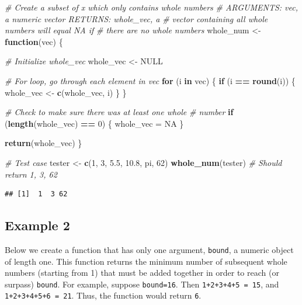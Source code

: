 \documentclass[
]{book}
\newenvironment{Shaded}{\begin{snugshade}}{\end{snugshade}}
\newcommand{\CommentTok}[1]{\textcolor[rgb]{0.56,0.35,0.01}{\textit{#1}}}
\newcommand{\ControlFlowTok}[1]{\textcolor[rgb]{0.13,0.29,0.53}{\textbf{#1}}}
\newcommand{\DecValTok}[1]{\textcolor[rgb]{0.00,0.00,0.81}{#1}}
\newcommand{\FloatTok}[1]{\textcolor[rgb]{0.00,0.00,0.81}{#1}}
\newcommand{\KeywordTok}[1]{\textcolor[rgb]{0.13,0.29,0.53}{\textbf{#1}}}
\newcommand{\NormalTok}[1]{#1}
\newcommand{\OperatorTok}[1]{\textcolor[rgb]{0.81,0.36,0.00}{\textbf{#1}}}
\newcommand{\OtherTok}[1]{\textcolor[rgb]{0.56,0.35,0.01}{#1}}
\newcommand{\StringTok}[1]{\textcolor[rgb]{0.31,0.60,0.02}{#1}}
\begin{document}
\begin{Shaded}
\begin{Highlighting}[]
\CommentTok{# Create a subset of x which only contains whole numbers}
\CommentTok{# ARGUMENTS: vec, a numeric vector RETURNS: whole_vec, a}
\CommentTok{# vector containing all whole numbers will equal NA if}
\CommentTok{# there are no whole numbers}
\NormalTok{whole_num <-}\StringTok{ }\ControlFlowTok{function}\NormalTok{(vec) \{}

    \CommentTok{# Initialize whole_vec}
\NormalTok{    whole_vec <-}\StringTok{ }\OtherTok{NULL}

    \CommentTok{# For loop, go through each element in vec}
    \ControlFlowTok{for}\NormalTok{ (i }\ControlFlowTok{in}\NormalTok{ vec) \{}
        \ControlFlowTok{if}\NormalTok{ (i }\OperatorTok{==}\StringTok{ }\KeywordTok{round}\NormalTok{(i)) \{}
\NormalTok{            whole_vec <-}\StringTok{ }\KeywordTok{c}\NormalTok{(whole_vec, i)}
\NormalTok{        \}}
\NormalTok{    \}}

    \CommentTok{# Check to make sure there was at least one whole}
    \CommentTok{# number}
    \ControlFlowTok{if}\NormalTok{ (}\KeywordTok{length}\NormalTok{(whole_vec) }\OperatorTok{==}\StringTok{ }\DecValTok{0}\NormalTok{) \{}
\NormalTok{        whole_vec =}\StringTok{ }\OtherTok{NA}
\NormalTok{    \}}

    \KeywordTok{return}\NormalTok{(whole_vec)}
\NormalTok{\}}


\CommentTok{# Test case}
\NormalTok{tester <-}\StringTok{ }\KeywordTok{c}\NormalTok{(}\DecValTok{1}\NormalTok{, }\DecValTok{3}\NormalTok{, }\FloatTok{5.5}\NormalTok{, }\FloatTok{10.8}\NormalTok{, pi, }\DecValTok{62}\NormalTok{)}
\KeywordTok{whole_num}\NormalTok{(tester)  }\CommentTok{# Should return 1, 3, 62}
\end{Highlighting}
\end{Shaded}

\begin{verbatim}
## [1]  1  3 62
\end{verbatim}

\hypertarget{example-2}{%
\subsection{Example 2}\label{example-2}}

Below we create a function that has only one argument, \texttt{bound}, a numeric object of length one. This function returns the minimum number of subsequent whole numbers (starting from 1) that must be added together in order to reach (or surpass) \texttt{bound}. For example, suppose \texttt{bound=16}. Then \texttt{1+2+3+4+5\ =\ 15}, and \texttt{1+2+3+4+5+6\ =\ 21}. Thus, the function would return \texttt{6}.
\end{document}
